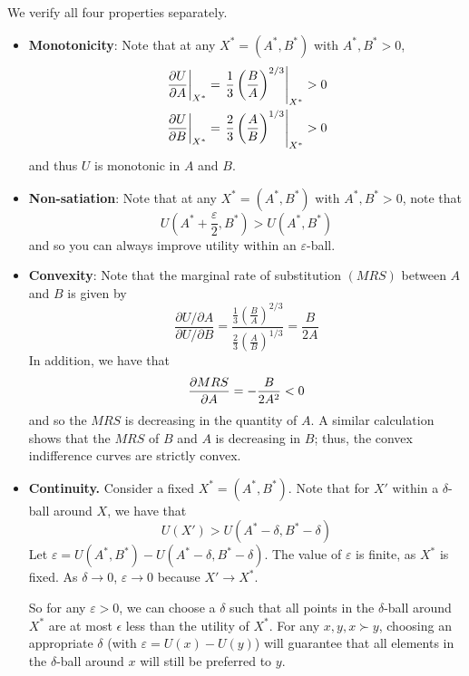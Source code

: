 \documentclass[answers, reflections, 11pt]{padajar-pset}
\begin{document}
\begin{questions}
\begin{parts}
	\begin{solution}
		We verify all four properties separately.
		\begin{itemize}
			\item \textbf{Monotonicity}: Note that at any $X^* = (A^*, B^*)$ with $A^*,B^* > 0$,
			\begin{align*}
				\left.\pdv{U}{A}\right|_{X^*} &= \left. \frac13 \left(\frac{B}{A}\right)^{2/3}\right|_{X^*} > 0 \\
				\left.\pdv{U}{B}\right|_{X^*} &= \left. \frac23 \left(\frac{A}{B}\right)^{1/3}\right|_{X^*} > 0
			\end{align*}
			and thus $U$ is monotonic in $A$ and $B$.
			\item \textbf{Non-satiation}: Note that at any $X^* = (A^*, B^*)$ with $A^*,B^* > 0$, note that
			\[
			U\left(A^* + \frac{\varepsilon}{2}, B^*\right) > U(A^*, B^*)
			\]
			and so you can always improve utility within an $\varepsilon$-ball.
			\item \textbf{Convexity}: Note that the marginal rate of substitution $(MRS)$ between $A$ and $B$ is given by
			\[
			\frac{\partial U / \partial A}{\partial U / \partial B 	}= \frac{\frac13 \left( \frac{B}{A}\right)^{2/3}}{\frac23 \left(\frac{A}{B}\right)^{1/3}} = \frac{B}{2A}
			\]
			In addition, we have that
			\[
			\pdv{MRS}{A} = -\frac{B}{2A^2} < 0
			\]
			and so the $MRS$ is decreasing in the quantity of $A$. A similar calculation shows that the $MRS$ of $B$ and $A$ is decreasing in $B$; thus, the convex indifference curves are strictly convex.
			\item \textbf{Continuity.} Consider a fixed $X^* = (A^*, B^*)$. Note that for $X'$ within a $\delta$-ball around $X$, we have that
			\[
			U(X') > U(A^* - \delta, B^* - \delta)
			\]
			Let $\varepsilon = U(A^*, B^*) - U(A^* - \delta, B^* - \delta)$. The value of $\varepsilon$ is finite, as $X^*$ is fixed. As $\delta \rightarrow 0$, $\varepsilon \rightarrow 0$ because $X' \rightarrow X^*$.

			So for any $\varepsilon > 0$, we can choose a $\delta$ such that all points in the $\delta$-ball around $X^*$ are at most $\epsilon$ less than the utility of $X^*$. For any $x, y, x \succ y$, choosing an appropriate $\delta$ (with $\varepsilon = U(x) - U(y)$) will guarantee that all elements in the $\delta$-ball around $x$ will still be preferred to $y$.
		\end{itemize}
	\end{solution}
	\begin{reflection}
		\lipsum[1]
	\end{reflection}


\end{parts}
\end{questions}
\end{document}
